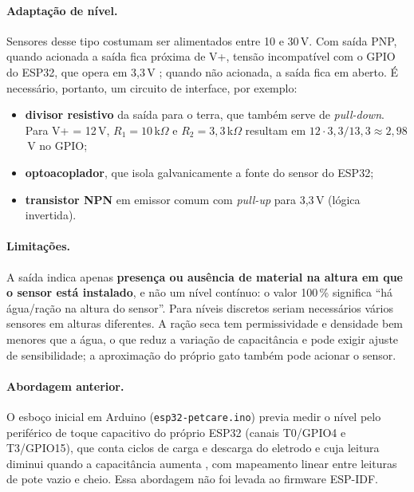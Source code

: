 \paragraph{Adaptação de nível.}
Sensores desse tipo costumam ser alimentados entre 10 e 30\,V. Com saída PNP, quando acionada a saída fica próxima de V+, tensão incompatível com o GPIO do ESP32, que opera em 3,3\,V \citep{esp32datasheet}; quando não acionada, a saída fica em aberto. É necessário, portanto, um circuito de interface, por exemplo:
\begin{itemize}
  \item \textbf{divisor resistivo} da saída para o terra, que também serve de \textit{pull-down}. Para V+ = 12\,V, $R_1 = 10$\,k$\Omega$ e $R_2 = 3{,}3$\,k$\Omega$ resultam em $12 \cdot 3{,}3/13{,}3 \approx 2{,}98$\,V no GPIO;
  \item \textbf{optoacoplador}, que isola galvanicamente a fonte do sensor do ESP32;
  \item \textbf{transistor NPN} em emissor comum com \textit{pull-up} para 3,3\,V (lógica invertida).
\end{itemize}

\paragraph{Limitações.}
A saída indica apenas \textbf{presença ou ausência de material na altura em que o sensor está instalado}, e não um nível contínuo: o valor 100\,\% significa ``há água/ração na altura do sensor''. Para níveis discretos seriam necessários vários sensores em alturas diferentes. A ração seca tem permissividade e densidade bem menores que a água, o que reduz a variação de capacitância e pode exigir ajuste de sensibilidade; a aproximação do próprio gato também pode acionar o sensor. 

\paragraph{Abordagem anterior.}
O esboço inicial em Arduino (\texttt{esp32-petcare.ino}) previa medir o nível pelo periférico de toque capacitivo do próprio ESP32 (canais T0/GPIO4 e T3/GPIO15), que conta ciclos de carga e descarga do eletrodo e cuja leitura diminui quando a capacitância aumenta \citep{espidftouch}, com mapeamento linear entre leituras de pote vazio e cheio. Essa abordagem não foi levada ao firmware ESP-IDF. 
